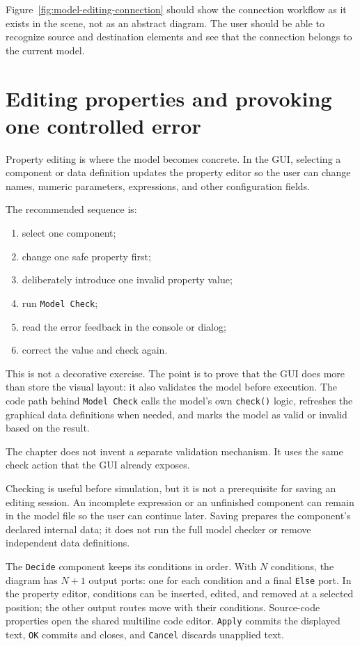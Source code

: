 Figure~\ref{fig:model-editing-connection} should show the connection workflow as it exists in the scene,
not as an abstract diagram. The user should be able to recognize source and destination elements and
see that the connection belongs to the current model.

\section{Editing properties and provoking one controlled error}
\label{sec:model-editing-properties-and-validation}

Property editing is where the model becomes concrete. In the GUI, selecting a component or data
definition updates the property editor so the user can change names, numeric parameters, expressions,
and other configuration fields.

The recommended sequence is:
\begin{enumerate}
\item select one component;
\item change one safe property first;
\item deliberately introduce one invalid property value;
\item run \texttt{Model Check};
\item read the error feedback in the console or dialog;
\item correct the value and check again.
\end{enumerate}

This is not a decorative exercise. The point is to prove that the GUI does more than store the visual
layout: it also validates the model before execution. The code path behind \texttt{Model Check} calls the
model's own \texttt{check()} logic, refreshes the graphical data definitions when needed, and marks the
model as valid or invalid based on the result.

The chapter does not invent a separate validation mechanism. It uses the same check action that the GUI
already exposes.

Checking is useful before simulation, but it is not a prerequisite for saving an editing session. An
incomplete expression or an unfinished component can remain in the model file so the user can continue
later. Saving prepares the component's declared internal data; it does not run the full model checker or
remove independent data definitions.

The \texttt{Decide} component keeps its conditions in order. With \(N\) conditions, the diagram has
\(N+1\) output ports: one for each condition and a final \texttt{Else} port. In the property editor,
conditions can be inserted, edited, and removed at a selected position; the other output routes move with
their conditions. Source-code properties open the shared multiline code editor. \texttt{Apply} commits
the displayed text, \texttt{OK} commits and closes, and \texttt{Cancel} discards unapplied text.

